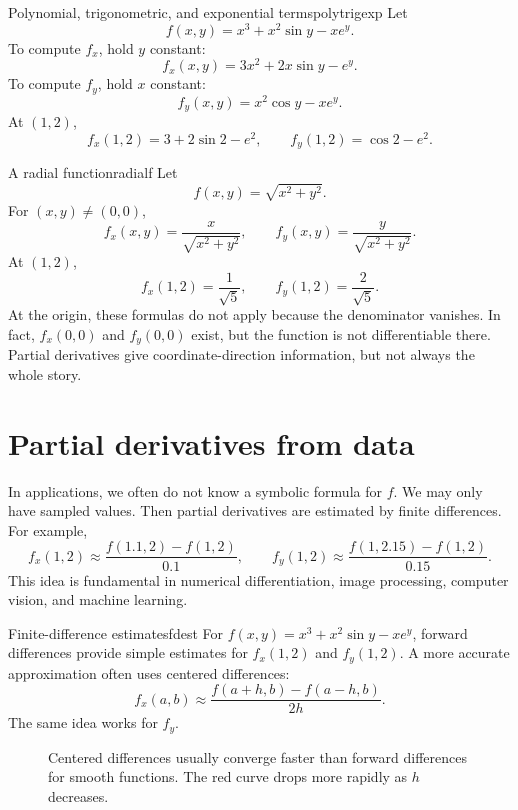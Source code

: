\documentclass[11pt]{article}
\begin{document}
\begin{examplebox}{Polynomial, trigonometric, and exponential terms}{polytrigexp}
Let
\[
f(x,y)=x^3+x^2\sin y-xe^y.
\]
To compute $f_x$, hold $y$ constant:
\[
f_x(x,y)=3x^2+2x\sin y-e^y.
\]
To compute $f_y$, hold $x$ constant:
\[
f_y(x,y)=x^2\cos y-xe^y.
\]
At $(1,2)$,
\[
f_x(1,2)=3+2\sin 2-e^2,
\qquad
f_y(1,2)=\cos 2-e^2.
\]
\end{examplebox}

\begin{examplebox}{A radial function}{radialf}
Let
\[
f(x,y)=\sqrt{x^2+y^2}.
\]
For $(x,y)\ne(0,0)$,
\[
f_x(x,y)=\frac{x}{\sqrt{x^2+y^2}},
\qquad
f_y(x,y)=\frac{y}{\sqrt{x^2+y^2}}.
\]
At $(1,2)$,
\[
f_x(1,2)=\frac{1}{\sqrt5},\qquad f_y(1,2)=\frac{2}{\sqrt5}.
\]
At the origin, these formulas do not apply because the denominator vanishes. In fact, $f_x(0,0)$ and $f_y(0,0)$ exist, but the function is not differentiable there. Partial derivatives give coordinate-direction information, but not always the whole story.
\end{examplebox}

\section{Partial derivatives from data}

In applications, we often do not know a symbolic formula for $f$. We may only have sampled values. Then partial derivatives are estimated by finite differences. For example,
\[
f_x(1,2)\approx \frac{f(1.1,2)-f(1,2)}{0.1},
\qquad
f_y(1,2)\approx \frac{f(1,2.15)-f(1,2)}{0.15}.
\]
This idea is fundamental in numerical differentiation, image processing, computer vision, and machine learning.

\begin{examplebox}{Finite-difference estimates}{fdest}
For $f(x,y)=x^3+x^2\sin y-xe^y$, forward differences provide simple estimates for $f_x(1,2)$ and $f_y(1,2)$. A more accurate approximation often uses centered differences:
\[
f_x(a,b)\approx \frac{f(a+h,b)-f(a-h,b)}{2h}.
\]
The same idea works for $f_y$.
\end{examplebox}

\begin{figure}[H]
\centering
{}
\caption{Centered differences usually converge faster than forward differences for smooth functions. The red curve drops more rapidly as $h$ decreases.}
\end{figure}
\end{document}
